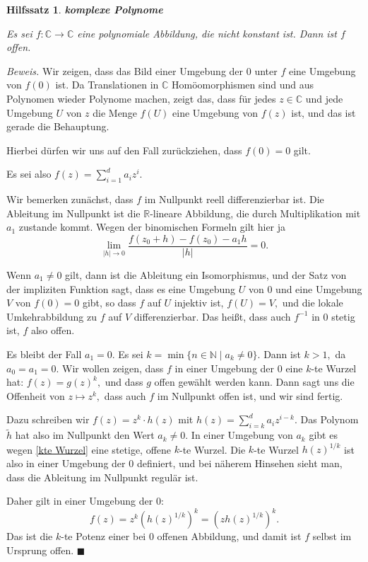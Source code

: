 \documentclass[12pt]{scrbook}   %
\newtheorem{hilfsX}[alles]{Hilfssatz}
\newenvironment{hilfs}[1]{\begin{hilfsX}{\bf #1}\par}{\end{hilfsX}}
\newcommand{\qed}{\phantom{.}\hfill{$\blacksquare$}}
\begin{document}
\begin{hilfs}{komplexe Polynome} \label{Polynom-offen}

Es sei $f:\mathbb C\longrightarrow \mathbb C$ eine polynomiale Abbildung,
die nicht konstant ist. Dann ist $f$ offen.
\end{hilfs}

{\it Beweis.}
Wir zeigen, dass das Bild einer Umgebung der $0$ unter $f$ eine Umgebung von 
$f(0)$ ist. Da Translationen in $\mathbb C$ Homöomorphismen sind und aus 
Polynomen wieder Polynome machen, zeigt das, dass für jedes $z\in \mathbb C$
und jede Umgebung $U$ von $z$ die Menge $f(U)$ eine Umgebung von $f(z)$ ist,
und das ist gerade die Behauptung.

Hierbei dürfen wir uns auf den Fall zurückziehen, dass $f(0)=0$ gilt.

Es sei also $f(z) = \sum_{i=1}^d a_iz^i.$

Wir bemerken zunächst, dass $f$ im Nullpunkt reell differenzierbar ist. 
Die Ableitung im Nullpunkt ist die $\mathbb R$-lineare Abbildung, die durch 
Multiplikation mit $a_1$ zustande kommt. Wegen der 
binomischen Formeln gilt hier ja
$$\lim_{|h|\to 0} \frac{f(z_0+h) - f(z_0) - a_1h }{|h|} = 0.$$

Wenn $a_1\neq 0$ gilt, dann ist die Ableitung ein Isomorphismus, und der 
Satz von der impliziten Funktion sagt, dass
es eine Umgebung $U$ von $0$ und eine Umgebung $V$ von $f(0)=0$ gibt, so dass
$f$ auf $U$ injektiv ist, $f(U) = V,$ und die lokale Umkehrabbildung zu $f$
auf $V$ differenzierbar. Das heißt, dass auch $f^{-1}$ in $0$ stetig ist, 
$f$ also offen.

Es bleibt der Fall $a_1=0.$ Es sei $k=\min\{n\in \mathbb N \mid a_k\neq 0\}.$
Dann ist $k>1,$ da $a_0=a_1=0.$ Wir wollen zeigen, dass $f$ in einer Umgebung
der $0$ eine $k$-te Wurzel hat: $f(z) = g(z)^k,$ und dass $g$ offen gewählt 
werden kann. Dann sagt uns die Offenheit von $z\mapsto z^k,$ dass auch $f$ im
Nullpunkt offen ist, und wir sind fertig.

Dazu schreiben wir $f(z) = z^k\cdot h(z)$ mit 
$h(z) = \sum_{i=k}^d a_i z^{i-k}.$
Das Polynom $\tilde h$ hat also im Nullpunkt den Wert $a_k\neq 0.$
In einer Umgebung von $a_k$ gibt es wegen \ref{kte Wurzel} eine stetige, offene 
$k$-te Wurzel. Die $k$-te Wurzel $h(z)^{1/k}$ ist also in einer Umgebung der $0$
definiert, und bei näherem Hinsehen sieht man, dass die Ableitung im 
Nullpunkt regulär ist.

Daher gilt in einer Umgebung der $0:$ 
$$f(z) = z^k (h(z)^{1/k})^k = (z h(z)^{1/k})^k.$$ 
Das ist die $k$-te Potenz einer bei $0$ offenen Abbildung, und damit ist $f$ 
selbst im Ursprung offen.
\qed
\end{document}
